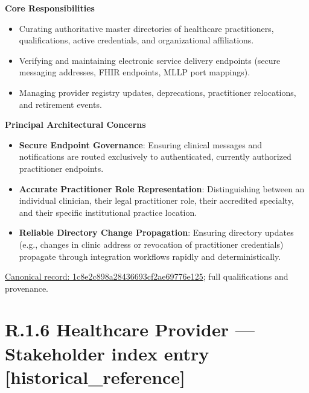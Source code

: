 \par\medskip\textbf{Core Responsibilities}\par


\begin{itemize}


\item Curating authoritative master directories of healthcare practitioners, qualifications, active credentials, and organizational affiliations.

\item Verifying and maintaining electronic service delivery endpoints (secure messaging addresses, FHIR endpoints, MLLP port mappings).

\item Managing provider registry updates, deprecations, practitioner relocations, and retirement events.

\end{itemize}


\par\medskip\textbf{Principal Architectural Concerns}\par


\begin{itemize}


\item \textbf{Secure Endpoint Governance}: Ensuring clinical messages and notifications are routed exclusively to authenticated, currently authorized practitioner endpoints.

\item \textbf{Accurate Practitioner Role Representation}: Distinguishing between an individual clinician, their legal practitioner role, their accredited specialty, and their specific institutional practice location.

\item \textbf{Reliable Directory Change Propagation}: Ensuring directory updates (e.g., changes in clinic address or revocation of practitioner credentials) propagate through integration workflows rapidly and deterministically.

\end{itemize}

{\footnotesize \href{../../../../continuum/motivation/stakeholder/1c8e2c898a28436693cf2ae69776e125.md}{Canonical record: 1c8e2c898a28436693cf2ae69776e125}; full qualifications and provenance.}\par
\section*{R.1.6 Healthcare Provider — Stakeholder index entry [historical\_reference]}
\label{navigation:R.1.6}

